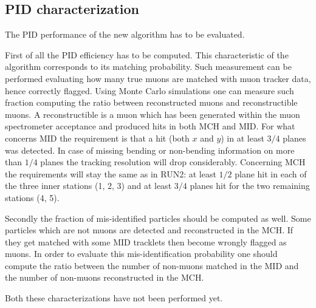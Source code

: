 \subsection{PID characterization}
The PID performance of the new algorithm has to be evaluated.

First of all the PID efficiency has to be computed.
This characteristic of the algorithm corresponds to its matching probability.
Such measurement can be performed evaluating how many true muons are matched with muon tracker data, hence correctly flagged.
Using Monte Carlo simulations one can measure such fraction computing the ratio between reconstructed muons and reconstructible muons.
A reconstructible is a muon which has been generated within the muon spectrometer acceptance and produced hits in both MCH and MID.
For what concerns MID the requirement is that a hit (both $x$ and $y$) in at least $3/4$ planes was detected.
In case of missing bending or non-bending information on more than $1/4$ planes the tracking resolution will drop considerably.
Concerning MCH the requirements will stay the same as in RUN2: at least $1/2$ plane hit in each of the three inner stations (1, 2, 3) and at least $3/4$ planes hit for the two remaining stations (4, 5).

Secondly the fraction of mis-identified particles should be computed as well.
Some particles which are not muons are detected and reconstructed in the MCH.
If they get matched with some MID tracklets then become wrongly flagged as muons.
In order to evaluate this mis-identification probability one should compute the ratio between the number of non-muons matched in the MID and the number of non-muons reconstructed in the MCH.

Both these characterizations have not been performed yet.

